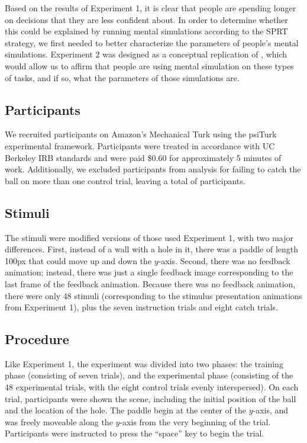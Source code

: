 \documentclass[10pt,letterpaper]{article}
\begin{document}
Based on the results of Experiment 1, it is clear that people are spending longer on decisions that they are less confident about. In order to determine whether this could be explained by running mental simulations according to the SPRT strategy, we first needed to better characterize the parameters of people's mental simulations. Experiment 2 was designed as a conceptual replication of , which would allow us to affirm that people are using mental simulation on these types of tasks, and if so, what the parameters of those simulations are.

\subsection{Participants}

We recruited \PaddleNumComplete{} participants on Amazon's Mechanical Turk using the psiTurk \cite{McDonnell12} experimental framework. Participants were treated in accordance with UC Berkeley IRB standards and were paid \$0.60 for approximately 5 minutes of work. Additionally, we excluded \PaddleNumFailed{} participants from analysis for failing to catch the ball on more than one control trial, leaving a total of \PaddleNumOk{} participants.

\subsection{Stimuli}

The stimuli were modified versions of those used Experiment 1, with two major differences. First, instead of a wall with a hole in it, there was a paddle of length 100px that could move up and down the $y$-axis. Second, there was no feedback animation; instead, there was just a single feedback image corresponding to the last frame of the feedback animation. Because there was no feedback animation, there were only 48 stimuli (corresponding to the stimulus presentation animations from Experiment 1), plus the seven instruction trials and eight catch trials.

\subsection{Procedure}

Like Experiment 1, the experiment was divided into two phases: the training phase (consisting of seven trials), and the experimental phase (consisting of the 48 experimental trials, with the eight control trials evenly interspersed). On each trial, participants were shown the scene, including the initial position of the ball and the location of the hole. The paddle begin at the center of the $y$-axis, and was freely moveable along the $y$-axis from the very beginning of the trial. Participants were instructed to press the ``space'' key to begin the trial. 
\end{document}
